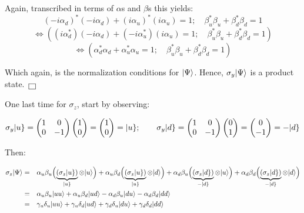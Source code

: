 \documentclass[solutions.tex]{subfiles}
\begin{document}
Again, transcribed in terms of $\alpha$s and $\beta$s this yields:
\[
	(-i\alpha_d)^*(-i\alpha_d) + (i\alpha_u)^*(i\alpha_u) = 1; \quad
	\beta_u^*\beta_u + \beta_d^*\beta_d = 1
\]
\[
	\Leftrightarrow\left(
		(i\alpha_d^*)(-i\alpha_d) + (-i\alpha_u^*)(i\alpha_u) = 1; \quad
		\beta_u^*\beta_u + \beta_d^*\beta_d = 1
	\right)
\]
\[
	\Leftrightarrow\left(
		\alpha_d^*\alpha_d + \alpha_u^*\alpha_u = 1; \quad
		\beta_u^*\beta_u + \beta_d^*\beta_d = 1
	\right)
\]

Which again, is the normalization conditions for $\ket{\Psi}$. Hence,
$\sigma_y\ket{\Psi}$ is a product state. $\qed$

\hrr

One last time for $\sigma_z$, start by observing:

\[
	\sigma_y\keit{u} = \begin{pmatrix}
		1 & 0 \\
		0 & -1 \\
	\end{pmatrix}\begin{pmatrix} 1 \\ 0 \\ \end{pmatrix} = \begin{pmatrix}
		1 \\ 0 \\
	\end{pmatrix} = \keit{u};\qquad\sigma_y\keit{d} = \begin{pmatrix}
		1 & 0 \\
		0 & -1 \\
	\end{pmatrix}\begin{pmatrix} 0 \\ 1 \\ \end{pmatrix} = \begin{pmatrix}
		0 \\ -1 \\
	\end{pmatrix} = -\keit{d}
\]

Then:

\begin{equation*}\begin{aligned}
	\sigma_z\ket{\Psi} &=&&
		  \alpha_u\beta_u\Bigl(\underbrace{(\sigma_z\keit{u})}_{\keit{u}}\otimes\ket{u}\Bigr)
		+ \alpha_u\beta_d\Bigl(\underbrace{(\sigma_z\keit{u})}_{\keit{u}}\otimes\ket{d}\Bigr)
		+ \alpha_d\beta_u\Bigl(\underbrace{(\sigma_z\keit{d})}_{-\keit{d}}\otimes\ket{u}\Bigr)
		+ \alpha_d\beta_d\Bigl(\underbrace{(\sigma_z\keit{d})}_{-\keit{d}}\otimes\ket{d}\Bigr) \\
	~ &=&& \alpha_u\beta_u\ket{uu} + \alpha_u\beta_d\ket{ud}
		- \alpha_d\beta_u\ket{du} -\alpha_d\beta_d\ket{dd} \\
	&=&& \gamma_u\delta_u\ket{uu} + \gamma_u\delta_d\ket{ud}
		+\gamma_d\delta_u\ket{du}+ \gamma_d\delta_d\ket{dd} \\
\end{aligned}\end{equation*}
\end{document}
